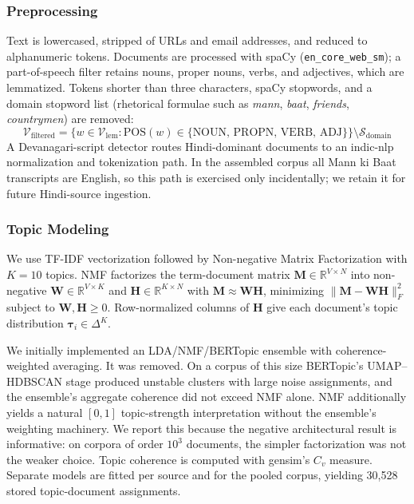 \documentclass[11pt]{article}
\begin{document}
\subsubsection{Preprocessing}
Text is lowercased, stripped of URLs and email addresses, and reduced to alphanumeric tokens. Documents are processed with spaCy (\texttt{en\_core\_web\_sm}); a part-of-speech filter retains nouns, proper nouns, verbs, and adjectives, which are lemmatized. Tokens shorter than three characters, spaCy stopwords, and a domain stopword list (rhetorical formulae such as \textit{mann}, \textit{baat}, \textit{friends}, \textit{countrymen}) are removed:
\begin{equation}
\mathcal{V}_{\text{filtered}} = \{w \in \mathcal{V}_{\text{lem}} : \text{POS}(w) \in \{\text{NOUN, PROPN, VERB, ADJ}\}\} \setminus \mathcal{S}_{\text{domain}}
\label{eq:pos_filter}
\end{equation}
A Devanagari-script detector routes Hindi-dominant documents to an indic-nlp normalization and tokenization path. In the assembled corpus all Mann ki Baat transcripts are English, so this path is exercised only incidentally; we retain it for future Hindi-source ingestion.

\subsubsection{Topic Modeling}
We use TF-IDF vectorization followed by Non-negative Matrix Factorization with $K = 10$ topics. NMF factorizes the term-document matrix $\mathbf{M} \in \mathbb{R}^{V \times N}$ into non-negative $\mathbf{W} \in \mathbb{R}^{V \times K}$ and $\mathbf{H} \in \mathbb{R}^{K \times N}$ with $\mathbf{M} \approx \mathbf{WH}$, minimizing $\|\mathbf{M} - \mathbf{WH}\|_F^2$ subject to $\mathbf{W}, \mathbf{H} \geq 0$. Row-normalized columns of $\mathbf{H}$ give each document's topic distribution $\boldsymbol{\tau}_i \in \Delta^K$.

We initially implemented an LDA/NMF/BERTopic ensemble with coherence-weighted averaging. It was removed. On a corpus of this size BERTopic's UMAP--HDBSCAN stage produced unstable clusters with large noise assignments, and the ensemble's aggregate coherence did not exceed NMF alone. NMF additionally yields a natural $[0,1]$ topic-strength interpretation without the ensemble's weighting machinery. We report this because the negative architectural result is informative: on corpora of order $10^3$ documents, the simpler factorization was not the weaker choice. Topic coherence is computed with gensim's $C_v$ measure. Separate models are fitted per source and for the pooled corpus, yielding 30{,}528 stored topic-document assignments.
\end{document}
